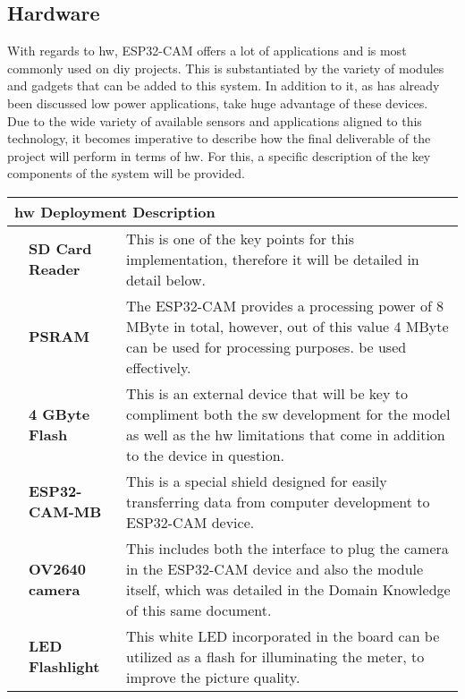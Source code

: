 \subsection{Hardware}
With regards to \ac{hw}, ESP32-CAM offers a lot of applications and is most commonly used on \ac{diy} projects. This is substantiated by the variety of modules and gadgets that can be added to this system. In addition to it, as has already been discussed low power applications, take huge advantage of these devices.  \autocite{Babiuch:2019} \\

Due to the wide variety of available sensors and applications aligned to this technology, it becomes imperative to describe how the final deliverable of the project will perform in terms of \ac{hw}. For this, a specific description of the key components of the system will be provided.

\bigskip

\begin{tabular}{llp{95mm}}
	\multicolumn{3}{l}{\large \textbf{\ac{hw} Deployment Description}}  \\ 
	\hline 
	& \textbf{SD Card Reader}  & This is one of the key points for this implementation, therefore it will be detailed in detail below. \\
	& \textbf{PSRAM} & The ESP32-CAM provides a processing power of 8 MByte in total, however, out of this value 4 MByte can be used for processing purposes.
	be used effectively. \\
	& \textbf{4 GByte Flash} & This is an external device that will be key to compliment both the \ac{sw} development for the model as well as the \ac{hw} limitations that come in addition to the device in question. \\
	& \textbf{ESP32-CAM-MB} & This is a special shield designed for easily transferring data from computer development to ESP32-CAM device. \\
	& \textbf{OV2640 camera} & This includes both the interface to plug the camera in the ESP32-CAM device and also the module itself, which was detailed in the Domain Knowledge of this same document.\\
	& \textbf{LED Flashlight} & This white LED incorporated in the board can be utilized as a flash for illuminating the meter, to improve the picture quality. \\
\end{tabular} \\

